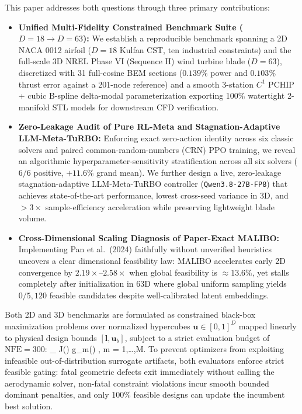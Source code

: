 \documentclass[11pt,fleqn,letterpaper]{article}
\begin{document}
This paper addresses both questions through three primary contributions:
\begin{itemize}
\setlength{\itemsep}{1.5pt}\setlength{\parskip}{0pt}\setlength{\topsep}{2pt}
\item \textbf{Unified Multi-Fidelity Constrained Benchmark Suite ($D=18 \to D=63$):} We establish a reproducible benchmark spanning a 2D NACA 0012 airfoil ($D=18$ Kulfan CST, ten industrial constraints) and the full-scale 3D NREL Phase VI (Sequence H) wind turbine blade ($D=63$), discretized with 31 full-cosine BEM sections ($0.139\%$ power and $0.103\%$ thrust error against a 201-node reference) and a smooth 3-station $C^1$ PCHIP + cubic B-spline delta-modal parameterization exporting 100\% watertight 2-manifold STL models for downstream CFD verification.
\item \textbf{Zero-Leakage Audit of Pure RL-Meta and Stagnation-Adaptive LLM-Meta-TuRBO:} Enforcing exact zero-action identity across six classic solvers and paired common-random-numbers (CRN) PPO training, we reveal an algorithmic hyperparameter-sensitivity stratification across all six solvers ($6/6$ positive, $+11.6\%$ grand mean). We further design a live, zero-leakage stagnation-adaptive LLM-Meta-TuRBO controller (\texttt{Qwen3.8-27B-FP8}) that achieves state-of-the-art performance, lowest cross-seed variance in 3D, and $>3\times$ sample-efficiency acceleration while preserving lightweight blade volume.
\item \textbf{Cross-Dimensional Scaling Diagnosis of Paper-Exact MALIBO:} Implementing Pan et al.\ (2024) faithfully without unverified heuristics uncovers a clear dimensional feasibility law: MALIBO accelerates early 2D convergence by $2.19\times$--$2.58\times$ when global feasibility is $\approx 13.6\%$, yet stalls completely after initialization in 63D where global uniform sampling yields $0/5{,}120$ feasible candidates despite well-calibrated latent embeddings.
\end{itemize}

Both 2D and 3D benchmarks are formulated as constrained black-box maximization problems over normalized hypercubes $\mathbf{u} \in [0, 1]^D$ mapped linearly to physical design bounds $[\mathbf{l}, \mathbf{u}_b]$, subject to a strict evaluation budget of $\text{NFE} = 300$:
\be
\max_{ } \; J() \quad {} \quad g_m() ,\;\; m = 1,\dots,M.
\label{eq:opt_general}
\ee
To prevent optimizers from exploiting infeasible out-of-distribution surrogate artifacts, both evaluators enforce strict feasible gating: fatal geometric defects exit immediately without calling the aerodynamic solver, non-fatal constraint violations incur smooth bounded dominant penalties, and only 100\% feasible designs can update the incumbent best solution.
\end{document}

